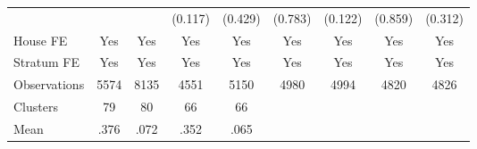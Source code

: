 {\begin{tabular}{l*{8}{c}}
                &                  &                  &  (0.117)         &  (0.429)         &  (0.783)         &  (0.122)         &  (0.859)         &  (0.312)         \\
House FE        &      Yes         &      Yes         &      Yes         &      Yes         &      Yes         &      Yes         &      Yes         &      Yes         \\
Stratum FE      &      Yes         &      Yes         &      Yes         &      Yes         &      Yes         &      Yes         &      Yes         &      Yes         \\
\midrule
Observations    &     5574         &     8135         &     4551         &     5150         &     4980         &     4994         &     4820         &     4826         \\
Clusters        &       79         &       80         &       66         &       66         &                  &                  &                  &                  \\
Mean            &     .376         &     .072         &     .352         &     .065         &                  &                  &                  &                  \\
\bottomrule
\end{tabular}
}
